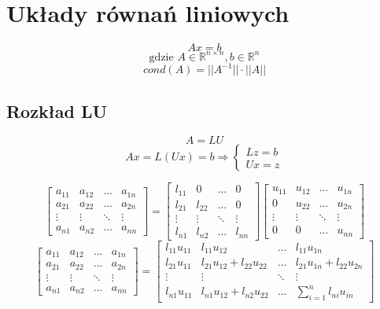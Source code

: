 \documentclass[../mn-notatki.tex]{subfiles}
\begin{document}
\section{Układy równań liniowych}

\begin{tcolorbox}
\[
Ax = b
\]
\[
\text{gdzie } A \in \mathbb{R}^{n \times n}, b \in \mathbb{R}^n
\]
\[
cond(A) = ||A^{-1}||\cdot ||A||
\]
\end{tcolorbox}

\subsection{Rozkład LU}

\begin{tcolorbox}
\[
A = LU
\]
\[
Ax = L(Ux) = b \Rightarrow \begin{cases}
Lz = b\\
Ux = z
\end{cases}
\]
\end{tcolorbox}

\[
\begin{bmatrix}
a_{11} & a_{12} & \ldots & a_{1n}\\
a_{21} & a_{22} & \ldots & a_{2n}\\
\vdots & \vdots & \ddots & \vdots\\
a_{n1} & a_{n2} & \ldots & a_{nn}
\end{bmatrix}
=
\begin{bmatrix}
l_{11} & 0 & \ldots & 0\\
l_{21} & l_{22} & \ldots & 0\\
\vdots & \vdots & \ddots & \vdots\\
l_{n1} & l_{n2} & \ldots & l_{nn}
\end{bmatrix}
\begin{bmatrix}
u_{11} & u_{12} & \ldots & u_{1n}\\
0      & u_{22} & \ldots & u_{2n}\\
\vdots & \vdots & \ddots & \vdots\\
0      & 0      & \ldots & u_{nn}
\end{bmatrix}
\]
\[
\begin{bmatrix}
a_{11} & a_{12} & \ldots & a_{1n}\\
a_{21} & a_{22} & \ldots & a_{2n}\\
\vdots & \vdots & \ddots & \vdots\\
a_{n1} & a_{n2} & \ldots & a_{nn}
\end{bmatrix}
=
\begin{bmatrix}
l_{11}u_{11} & l_{11}u_{12} & \ldots & l_{11}u_{1n}\\
l_{21}u_{11} & l_{21}u_{12} + l_{22}u_{22} & \ldots & l_{21}u_{1n} + l_{22}u_{2n}\\
\vdots & \vdots & \ddots & \vdots\\
l_{n1}u_{11} & l_{n1}u_{12} + l_{n2}u_{22} & \ldots & \sum_{i=1}^{n} l_{ni}u_{in}
\end{bmatrix}
\]
\end{document}
